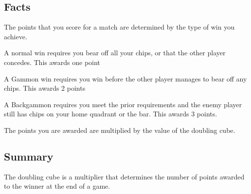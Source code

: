 \documentclass{report}
\begin{document}
\subsection{Facts}

\begin{dashed}
    \item The points that you score for a match are determined by the type of win you achieve.
    \item A normal win requires you bear off all your chips, or that the other player concedes. This    awards one point
    \item A Gammon win requires you win before the other player manages to bear off any chips. This awards 2 points
    \item A Backgammon requires you meet the prior requirements and the enemy player still has chips on your home quadrant or the bar. This awards 3 points.
    \item The points you are awarded are multiplied by the value of the doubling cube.
\end{dashed}

\subsection{Summary}
The doubling cube is a multiplier that determines the number of points awarded
to the winner at the end of a game.
\end{document}
